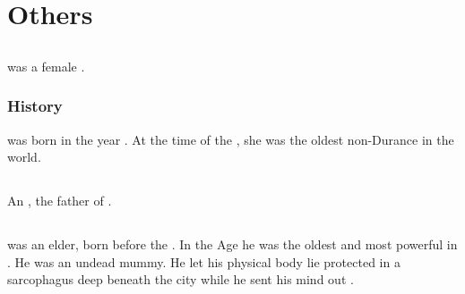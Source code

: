 \chapter{Others}















\section{\Hesherritan}
\index{\Hesherritan}
\Hesherritan was a female \ophidian.









\subsection{History}
\Hesherritan was born in the year . 
At the time of the \thirdbanewar, she was the oldest non-Durance \ophidian in the world.















\section{\HesodNerga}
\index{\HesodNerga}
An \ophidian{}, the father of .
















\section{\Ishtacca}
\index{\Ishtacca}
\Ishtacca was an \ophidian elder, born before the \firstbanewar. 
In the \Scatha Age he was the oldest and most powerful \ophidian in . 
He was an undead mummy.
He let his physical body lie protected in a sarcophagus deep beneath the city while he sent his mind out .

